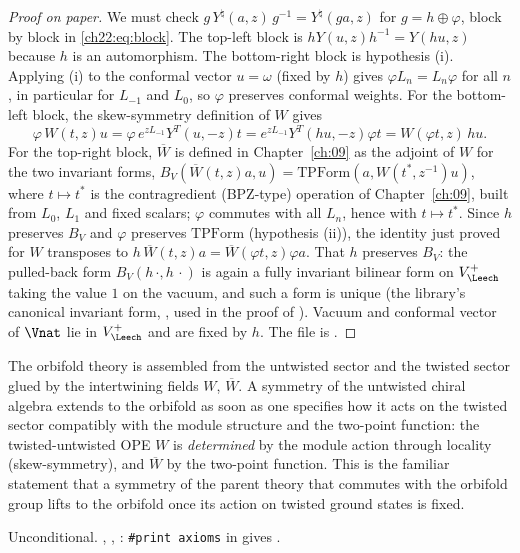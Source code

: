 \begin{proof}[Proof on paper]
We must check $g\,Y^\natural(a,z)\,g^{-1}=Y^\natural(ga,z)$ for $g=h\oplus\varphi$, block by block in
\eqref{ch22:eq:block}.  The top-left block is $hY(u,z)h^{-1}=Y(hu,z)$ because $h$ is an automorphism.  The
bottom-right block is hypothesis (i).  Applying (i) to the conformal vector $u=\omega$ (fixed by $h$) gives
$\varphi L_n=L_n\varphi$ for all $n$, in particular for $L_{-1}$ and $L_0$, so $\varphi$ preserves conformal weights.
For the bottom-left block, the skew-symmetry definition of $W$ gives
\begin{equation*}
  \varphi\,W(t,z)u=\varphi\,e^{zL_{-1}}Y^T(u,-z)t=e^{zL_{-1}}Y^T(hu,-z)\varphi t=W(\varphi t,z)\,hu.
\end{equation*}
For the top-right block, $\overline W$ is defined in Chapter~\ref{ch:09} as the adjoint of $W$ for the two
invariant forms, $B_V(\overline W(t,z)a,u)=\mathrm{TPForm}(a,W(t^*,z^{-1})u)$, where $t\mapsto t^*$ is the
contragredient (BPZ-type) operation of Chapter~\ref{ch:09}, built from $L_0$, $L_1$ and fixed scalars; $\varphi$ commutes
with all $L_n$, hence with $t\mapsto t^*$.  Since $h$ preserves $B_V$ and $\varphi$ preserves
$\mathrm{TPForm}$ (hypothesis (ii)), the identity just proved for $W$ transposes to
$h\,\overline W(t,z)a=\overline W(\varphi t,z)\varphi a$.  That $h$ preserves $B_V$: the pulled-back form $B_V(h\,\cdot,h\,\cdot)$ is again a fully invariant
bilinear form on $V_\Leech^+$ taking the value $1$ on the vacuum, and such a form is unique (the library's canonical
invariant form, , used in the proof of ).  Vacuum and conformal vector of $\Vnat$ lie in $V_\Leech^+$ and are fixed by
$h$.  The file is .
\end{proof}
\begin{physics}
The orbifold theory is assembled from the untwisted sector and the twisted sector glued by the intertwining
fields $W$, $\overline W$.  A symmetry of the untwisted chiral algebra extends to the orbifold as soon as one specifies
how it acts on the twisted sector compatibly with the module structure and the two-point function: the
twisted-untwisted OPE $W$ is \emph{determined} by the module action through locality (skew-symmetry), and
$\overline W$ by the two-point function.  This is the familiar statement that a symmetry of the parent theory that
commutes with the orbifold group lifts to the orbifold once its action on twisted ground states is fixed.
\end{physics}
\begin{status}
Unconditional.  , , : \texttt{\#print axioms} in
 gives .
\end{status}

